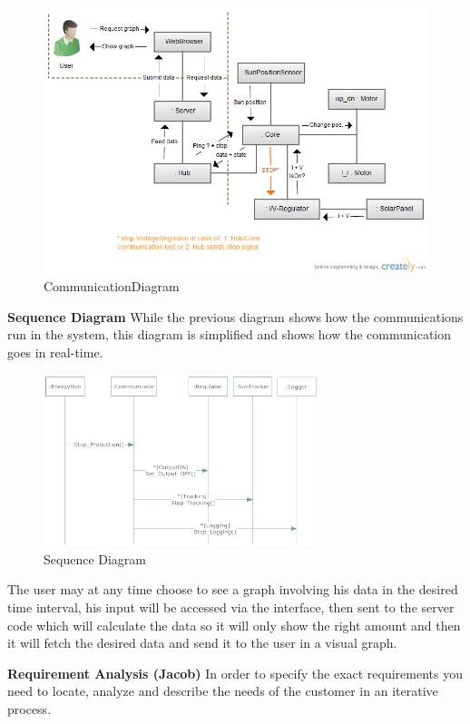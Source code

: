 \documentclass[12pt,a4paper]{report}
\begin{document}
\begin{figure}[htbp]
\centering
\includegraphics[width=12cm]{images/communicationdiagram}
\caption{CommunicationDiagram}
\label{fig:CommunicationDiagram}
\end{figure}


\textbf{Sequence Diagram}
While the previous diagram shows how the communications run in the system, this diagram is simplified and shows how the communication goes in real-time.

\begin{figure}[htbp]
\centering
\includegraphics[width=8cm]{images/SequenceDiagram}
\caption{Sequence Diagram}
\label{fig:SequenceDiagram}
\end{figure}


The user may at any time choose to see a graph involving his data in the desired time interval, his input will be accessed via the interface, then sent to the server code which will calculate the data so it will only show the right amount and then it will fetch the desired data and send it to the user in a visual graph. 	

\textbf{Requirement Analysis (Jacob)}
In order to specify the exact requirements you need to locate, analyze and describe the needs of the customer in an iterative process.
\end{document}
